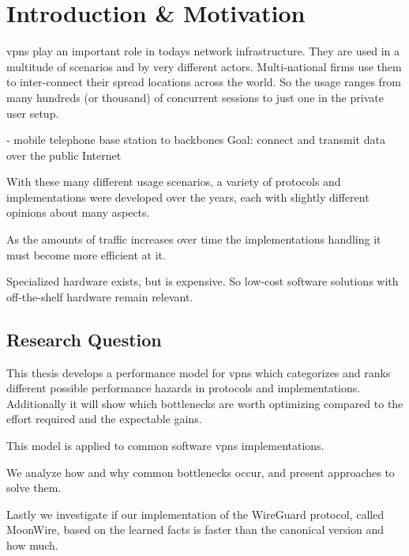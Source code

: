 \chapter{Introduction \& Motivation}
\label{chap:intro}

\Acp{vpn} play an important role in todays network infrastructure. %
They are used in a multitude of scenarios and by very different actors. Multi-national firms use them to inter-connect their spread locations across the world. 
So the usage ranges from many hundreds (or thousand) of concurrent sessions to just one in the private user setup.

- mobile telephone base station to backbones 
Goal: connect and transmit data over the public Internet

With these many different usage scenarios, a variety of protocols and implementations were developed over the years, each with slightly different opinions about many aspects.

As the amounts of traffic increases over time \cite{DECIX} the implementations handling it must become more efficient at it.

Specialized hardware exists, but is expensive. So low-cost software solutions with off-the-shelf hardware remain relevant.

\section{Research Question}
This thesis develops a performance model for \Acp{vpn} which categorizes and ranks different possible performance hazards in protocols and implementations. Additionally it will show which bottlenecks are worth optimizing compared to the effort required and the expectable gains.

This model is applied to common software \Acp{vpn} implementations.

We analyze how and why common bottlenecks occur, and present approaches to solve them.

Lastly we investigate if our implementation of the WireGuard protocol, called MoonWire, based on the learned facts is faster than the canonical version and how much.

